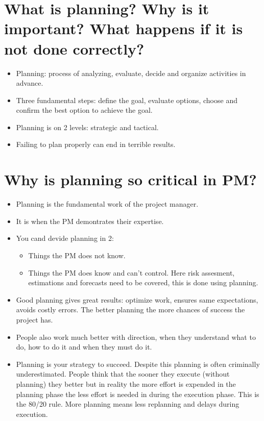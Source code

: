 \section{What is planning? Why is it important? What happens if it is not done correctly?}
\begin{itemize}
    \item Planning: process of analyzing, evaluate, decide and organize activities in advance.
    \item Three fundamental steps: define the goal, evaluate options, choose and confirm the best option to achieve the goal.
    \item Planning is on 2 levels: strategic and tactical.
    \item Failing to plan properly can end in terrible results.
\end{itemize}

\section{Why is planning so critical in PM?}
\begin{itemize}
    \item Planning is the fundamental work of the project manager.
    \item It is when the PM demontrates their expertise.
    \item You cand devide planning in 2:
        \begin{itemize}
            \item Things the PM does not know.
            \item Things the PM does know and can't control. Here risk assesment, estimations and forecasts need to be covered, this is done using planning.
        \end{itemize}
    
    \item Good planning gives great results: optimize work, ensures same expectations, avoids costly errors. The better planning the more chances of success the project has.
    \item People also work much better with direction, when they understand what to do, how to do it and when they must do it.
    \item Planning is your strategy to succeed. Despite this planning is often criminally underestimated. People think that the sooner they execute (without planning) they better but in reality the more effort is expended in the planning phase the less effort is needed in during the execution phase. This is the 80/20 rule. More planning means less replanning and delays during execution.
\end{itemize}

